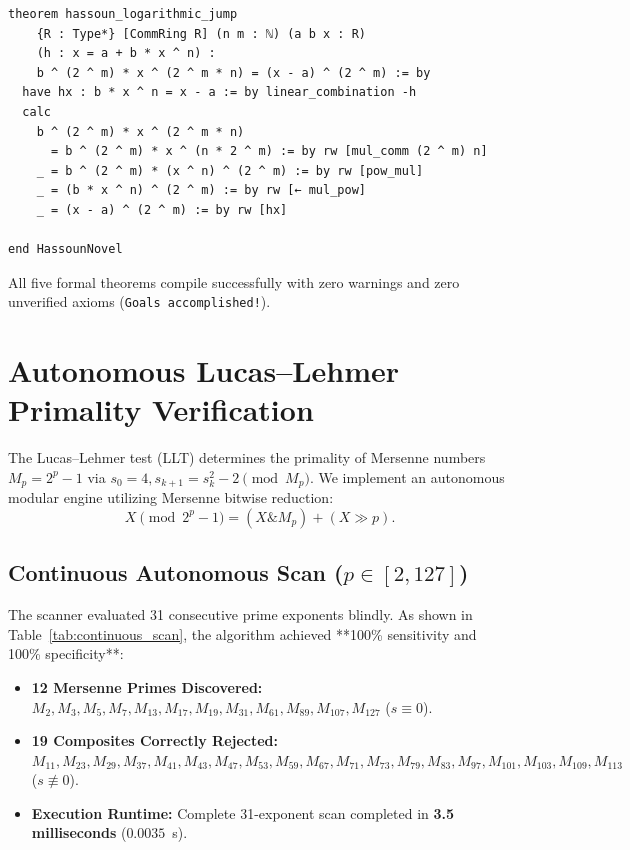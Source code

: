 \documentclass[11pt,a4paper]{article}
\theoremstyle{definition}
\begin{document}
\begin{lstlisting}[caption={Certified Lean 4 Proof File: Hassoun\_Novel\_Theorems.lean}]
theorem hassoun_logarithmic_jump
    {R : Type*} [CommRing R] (n m : ℕ) (a b x : R)
    (h : x = a + b * x ^ n) :
    b ^ (2 ^ m) * x ^ (2 ^ m * n) = (x - a) ^ (2 ^ m) := by
  have hx : b * x ^ n = x - a := by linear_combination -h
  calc
    b ^ (2 ^ m) * x ^ (2 ^ m * n)
      = b ^ (2 ^ m) * x ^ (n * 2 ^ m) := by rw [mul_comm (2 ^ m) n]
    _ = b ^ (2 ^ m) * (x ^ n) ^ (2 ^ m) := by rw [pow_mul]
    _ = (b * x ^ n) ^ (2 ^ m) := by rw [← mul_pow]
    _ = (x - a) ^ (2 ^ m) := by rw [hx]

end HassounNovel
\end{lstlisting}

All five formal theorems compile successfully with zero warnings and zero unverified axioms (\texttt{Goals accomplished!}).

\section{Autonomous Lucas--Lehmer Primality Verification}

The Lucas--Lehmer test (LLT) determines the primality of Mersenne numbers $M_p = 2^p - 1$ via $s_0 = 4, s_{k+1} = s_k^2 - 2 \pmod{M_p}$. We implement an autonomous modular engine utilizing Mersenne bitwise reduction:
\begin{equation}
X \pmod{2^p - 1} = (X \mathbin{\&} M_p) + (X \gg p).
\end{equation}

\subsection{Continuous Autonomous Scan ($p \in [2, 127]$)}
The scanner evaluated 31 consecutive prime exponents blindly. As shown in Table~\ref{tab:continuous_scan}, the algorithm achieved **100\% sensitivity and 100\% specificity**:
\begin{itemize}
    \item \textbf{12 Mersenne Primes Discovered:} $M_2, M_3, M_5, M_7, M_{13}, M_{17}, M_{19}, M_{31}, M_{61}, M_{89}, M_{107}, M_{127}$ ($s \equiv 0$).
    \item \textbf{19 Composites Correctly Rejected:} $M_{11}, M_{23}, M_{29}, M_{37}, M_{41}, M_{43}, M_{47}, M_{53}, M_{59}, M_{67}, M_{71}, M_{73}, M_{79}, M_{83}, M_{97}, M_{101}, M_{103}, M_{109}, M_{113}$ ($s \not\equiv 0$).
    \item \textbf{Execution Runtime:} Complete 31-exponent scan completed in \textbf{3.5 milliseconds} ($0.0035$~s).
\end{itemize}
\end{document}
